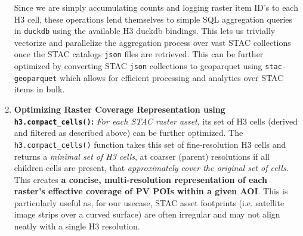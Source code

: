 \begin{enumerate}
        Since we are simply accumulating counts and logging raster item ID's to each H3 cell, these operations lend themselves to simple SQL aggregation queries in \texttt{duckdb} using the available H3 duckdb bindings. 
        This lets us trivially vectorize and parallelize the aggregation process over vast STAC collections once the STAC catalogs \texttt{json} files are retrieved. 
        This can be further optimized by converting STAC \texttt{json} collections to geoparquet using \texttt{stac-geoparquet} which allows for efficient processing and analytics over STAC items in bulk. 

    \item \textbf{Optimizing Raster Coverage Representation using \texttt{h3.compact\_cells()}:}
        \textit{For each STAC raster asset}, its set of H3 cells (derived and filtered as described above) can be further optimized.
        The \texttt{h3.compact\_cells()} function takes this set of fine-resolution H3 cells and returns a \textit{minimal set of H3 cells}, at coarser (parent) resolutions if all children cells are present, that \textit{approximately cover the original set of cells}.
        This creates \textbf{a concise, multi-resolution representation of each raster's effective coverage of PV POIs within a given AOI}. 
        This is particularly useful as, for our usecase, STAC asset footprints (i.e. satellite image strips over a curved surface) are often irregular and may not align neatly with a single H3 resolution. 


\end{enumerate}
